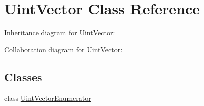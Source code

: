 \hypertarget{class_uint_vector}{\section{Uint\+Vector Class Reference}
\label{class_uint_vector}
}


Inheritance diagram for Uint\+Vector\+:


Collaboration diagram for Uint\+Vector\+:
\subsection*{Classes}
\begin{DoxyCompactItemize}
\item 
class \hyperlink{class_uint_vector_1_1_uint_vector_enumerator}{Uint\+Vector\+Enumerator}
\end{DoxyCompactItemize}
